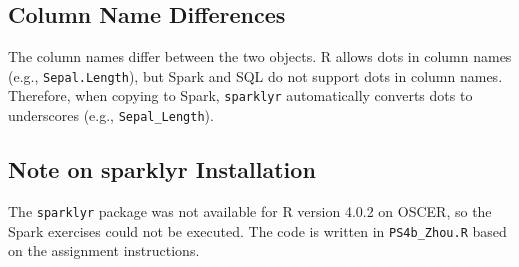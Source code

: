 \documentclass{article}
\begin{document}
\subsection{Column Name Differences}
The column names differ between the two objects. R allows dots in column names 
(e.g., \texttt{Sepal.Length}), but Spark and SQL do not support dots in column names. 
Therefore, when copying to Spark, \texttt{sparklyr} automatically converts dots 
to underscores (e.g., \texttt{Sepal\_Length}).

\subsection{Note on sparklyr Installation}
The \texttt{sparklyr} package was not available for R version 4.0.2 on OSCER, 
so the Spark exercises could not be executed. The code is written in 
\texttt{PS4b\_Zhou.R} based on the assignment instructions.
\end{document}
